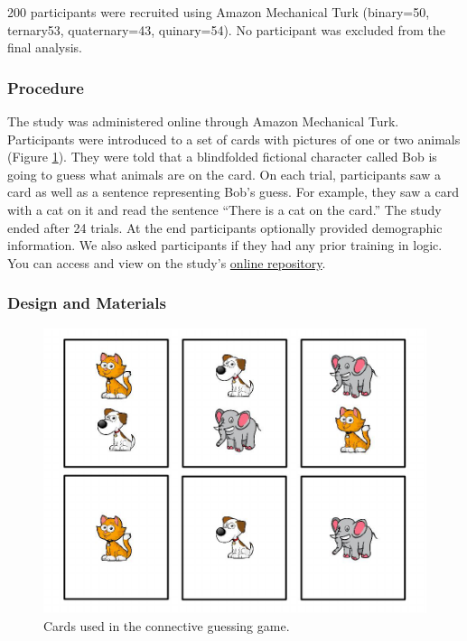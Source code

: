 \documentclass[floatsintext,man]{apa6}
\theoremstyle{definition}
\theoremstyle{definition}
\theoremstyle{definition}
\theoremstyle{remark}
\begin{document}
200 participants were recruited using Amazon Mechanical Turk (binary=50,
ternary53, quaternary=43, quinary=54). No participant was excluded from
the final analysis.

\subsubsection{Procedure}\label{procedure}

The study was administered online through Amazon Mechanical Turk.
Participants were introduced to a set of cards with pictures of one or
two animals (Figure \ref{fig:stimuli}). They were told that a
blindfolded fictional character called Bob is going to guess what
animals are on the card. On each trial, participants saw a card as well
as a sentence representing Bob's guess. For example, they saw a card
with a cat on it and read the sentence \enquote{There is a cat on the
card.} The study ended after 24 trials. At the end participants
optionally provided demographic information. We also asked participants
if they had any prior training in logic. You can access and view on the
study's \href{https://github.com/thegricean/si-paradigms/}{online
repository}.

\subsubsection{Design and Materials}\label{design-and-materials}

\begin{figure}
\centering
\includegraphics{writeup_files/figure-latex/stimuli-1.pdf}
\caption{\label{fig:stimuli}Cards used in the connective guessing game.}
\end{figure}
\end{document}
